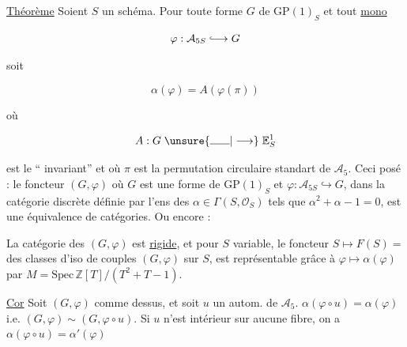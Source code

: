 \uline{Théorème} Soient $S$ un schéma. Pour toute forme $G$ de
$\mathrm{GP}(1)_S$ et tout \uline{mono}

\[
\varphi:\mathcal A_{5S}\lhook\joinrel\longrightarrow G
\]


soit

\[
\alpha(\varphi)=A(\varphi(\pi))
\]

où

\[
A:G\mathrel{\unsure{\rule{1.8em}{.4pt}|\longrightarrow}}\mathbb E^1_S
\]

est le `` invariant'' et où $\pi$ est la permutation
circulaire standart de $\mathcal A_5$. Ceci posé : le 
foncteur  $(G,\varphi)$  
où $G$ est une forme de
$\mathrm{GP}(1)_S$ et $\varphi:\mathcal A_{5S}\hookrightarrow G$, 
dans la catégorie
discrète définie par l'ens des $\alpha\in\Gamma(S,\mathcal O_S)$ tels
que $\alpha^2+\alpha-1=0$,
est une équivalence de catégories. Ou encore :


La catégorie des $(G,\varphi)$ est \uline{rigide}, et pour
$S$ variable, le foncteur $S\longmapsto F(S)={}$  des
classes d'iso de couples $(G,\varphi)$ sur $S$, est représentable
grâce à $\varphi\mapsto\alpha(\varphi)$ par $M=\mathrm{Spec}\,\mathbb Z[T]/(T^2+T-1)$.

\uline{Cor} Soit $(G,\varphi)$ comme dessus, et soit $u$ un
autom. de $\mathcal A_5$.  
$\alpha(\varphi\circ u)=\alpha(\varphi)$ i.e. $(G,\varphi)\sim(G,\varphi\circ u)$. Si $u$ n'est
intérieur sur aucune fibre, on a $\alpha(\varphi\circ u)=\alpha'(\varphi)$

